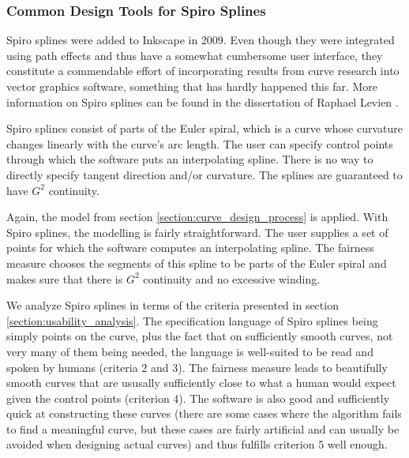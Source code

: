 \documentclass[a4paper]{article}
\begin{document}
			\subsubsection{Common Design Tools for Spiro Splines}

				Spiro splines were added to Inkscape in 2009. Even though they were integrated using path effects and thus have a somewhat cumbersome user interface, they constitute a commendable effort of incorporating results from curve research into vector graphics software, something that has hardly happened this far. More information on Spiro splines can be found in the dissertation of Raphael Levien \cite{Levien2009}.

				Spiro splines consist of parts of the Euler spiral, which is a curve whose curvature changes linearly with the curve's arc length. The user can specify control points through which the software puts an interpolating spline. There is no way to directly specify tangent direction and/or curvature. The splines are guaranteed to have \(G^2\) continuity.

				Again, the model from section \ref{section:curve_design_process} is applied. With Spiro splines, the modelling is fairly straightforward. The user supplies a set of points for which the software computes an interpolating spline. The fairness measure chooses the segments of this spline to be parts of the Euler spiral and makes sure that there is \(G^2\) continuity and no excessive winding.

				We analyze Spiro splines in terms of the criteria presented in section \ref{section:usability_analysis}. The specification language of Spiro splines being simply points on the curve, plus the fact that on sufficiently smooth curves, not very many of them being needed, the language is well-suited to be read and spoken by humans (criteria 2 and 3). The fairness measure leads to beautifully smooth curves that are ususally sufficiently close to what a human would expect given the control points (criterion 4). The software is also good and sufficiently quick at constructing these curves (there are some cases where the algorithm fails to find a meaningful curve, but these cases are fairly artificial and can usually be avoided when designing actual curves) and thus fulfills criterion 5 well enough.
\end{document}
